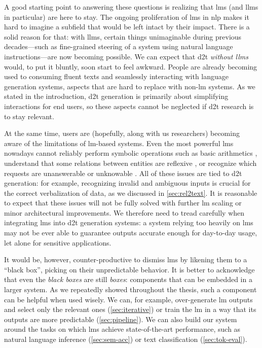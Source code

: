 A good starting point to answering these questions is realizing that \aclp{lm} (and \acp{llm} in particular) are here to stay. The ongoing proliferation of \acp{lm} in \acl{nlp} \cite{min2023recent,zhao2023survey,naveed2024comprehensive} makes it hard to imagine a subfield that would be left intact by their impact. There is a solid reason for that: with \acp{llm}, certain things unimaginable during previous decades---such as fine-grained steering of a system using natural language instructions---are now becoming possible. We can expect that \ac{d2t} \emph{without \acp{llm}} would, to put it bluntly, soon start to feel awkward. People are already becoming used to consuming fluent texts and seamlessly interacting with language generation systems, aspects that are hard to replace with non-\ac{lm} systems. As we stated in the introduction, \ac{d2t} generation is primarily about simplifying interactions for end users, so these aspects cannot be neglected if \ac{d2t} research is to stay relevant.

At the same time, users are (hopefully, along with us researchers) becoming aware of the limitations of \ac{lm}-based systems. Even the most powerful \acp{lm} nowadays cannot reliably perform symbolic operations such as basic arithmetics \cite{qian2023limitations}, understand that some relations between entities are reflexive \cite{berglund2024the}, or recognize which requests are unanswerable or unknowable \cite{yin2023large}. All of these issues are tied to \ac{d2t} generation: for example, recognizing invalid and ambiguous inputs is crucial for the correct verbalization of data, as we discussed in \autoref{sec:rel2text}. It is reasonable to expect that these issues will not be fully solved with further \ac{lm} scaling or minor architectural improvements. We therefore need to tread carefully when integrating \acp{lm} into \ac{d2t} generation systems: a system relying too heavily on \acp{lm} may not be ever able to guarantee outputs accurate enough for day-to-day usage, let alone for sensitive applications.

It would be, however, counter-productive to dismiss \acp{lm} by likening them to a ``black box'', picking on their unpredictable behavior. It is better to acknowledge that even the \emph{black boxes} are still \emph{boxes}: components that can be embedded in a larger system. As we repeatedly showed throughout the thesis, such a component can be helpful when used wisely. We can, for example, over-generate \ac{lm} outputs and select only the relevant ones (\autoref{sec:iterative}) or train the \ac{lm} in a way that its outputs are more predictable (\autoref{sec:pipeline}). We can also build our system around the tasks on which \acp{lm} achieve state-of-the-art performance, such as natural language inference (\autoref{sec:sem-acc}) or text classification (\autoref{sec:tok-eval}).

